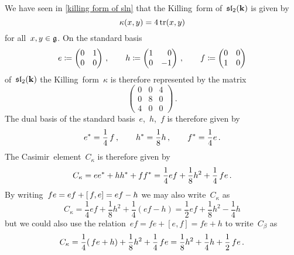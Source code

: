 \begin{example}
  We have seen in \cref{killing form of sln} that the Killing~form of~$\mathfrak{sl}_2(\mathbf{k})$ is given by
  \[
    \kappa(x,y)
    =
    4\operatorname{tr}(x,y)
  \]
  for all~$x, y \in \mathfrak{g}$.
  On the standard basis
  \[
    e
    \defined
    \begin{pmatrix}
      0 & 1 \\
      0 & 0
    \end{pmatrix} \,,
    \qquad
    h
    \defined
    \begin{pmatrix*}[r]
      1 &  0  \\
      0 & -1
    \end{pmatrix*}  \,,
    \qquad
    f
    \defined
    \begin{pmatrix}
      0 & 0 \\
      1 & 0
    \end{pmatrix}
  \]
  of~$\mathfrak{sl}_2(\mathbf{k})$ the Killing~form~$\kappa$ is therefore represented by the matrix
  \[
    \begin{pmatrix}
      0
      &
      0
      &
      4
      \\
      0
      &
      8
      & 
      0
      \\
      4
      &
      0
      &
      0
    \end{pmatrix} \,.
  \]
  The dual basis of the standard basis~$e$,~$h$,~$f$ is therefore given by
  \[
    e^*
    =
    \frac{1}{4} \, f \,,
    \qquad
    h^*
    =
    \frac{1}{8} h \,,
    \qquad
    f^*
    =
    \frac{1}{4} e \,.
  \]
  The Casimir~element~$C_\kappa$ is therefore given by
  \[
    C_\kappa
    =
    e e^* + h h^* + f {} f^*
    =
    \frac{1}{4} ef + \frac{1}{8} h^2 + \frac{1}{4} \, fe \,.
  \]
  By writing~$fe = ef + [\, f,e] = ef - h$ we may also write~$C_\kappa$ as
  \[
    C_\kappa
    =
    \frac{1}{4} ef + \frac{1}{8} h^2 + \frac{1}{4} (ef - h)
    =
    \frac{1}{2} ef + \frac{1}{8} h^2 - \frac{1}{4} h
  \]
  but we could also use the relation~$ef = fe + [e,f] = fe + h$ to write~$C_\beta$ as
  \[
    C_\kappa
    =
    \frac{1}{4} ({\,}fe + h) + \frac{1}{8} h^2 + \frac{1}{4} \, fe
    =
    \frac{1}{8} h^2 + \frac{1}{4} h + \frac{1}{2} \, fe  \,.
  \]
\end{example}




